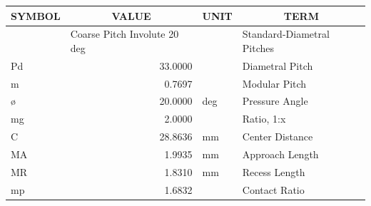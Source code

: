 \begin{appendices}
    \begin{center}
    \begin{tabular}{|l|r|l|l|}
    \hline
    \multicolumn{1}{|c|}{\textbf{SYMBOL}} & \multicolumn{1}{c|}{\textbf{VALUE}} & \multicolumn{1}{c|}{\textbf{UNIT}} & \multicolumn{1}{c|}{\textbf{TERM}} \\ \hline
     & \multicolumn{1}{l|}{Coarse Pitch Involute 20 deg} &  & Standard-Diametral Pitches \\ \hline
    Pd & 33.0000 &  & Diametral Pitch \\ \hline
    m & 0.7697 &  & Modular Pitch \\ \hline
    ø & 20.0000 & deg & Pressure Angle \\ \hline
    mg & 2.0000 &  & Ratio, 1:x \\ \hline
    C & 28.8636 & mm & Center Distance \\ \hline
    MA & 1.9935 & mm & Approach Length \\ \hline
    MR & 1.8310 & mm & Recess Length \\ \hline
    mp & 1.6832 &  & Contact Ratio \\ \hline
    \end{tabular}
    \end{center}


\end{appendices}
